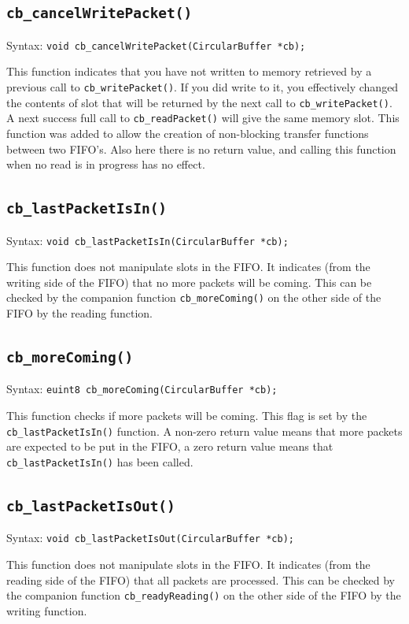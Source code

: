 \documentclass[a4paper]{article}
\begin{document}
\subsection*{\texttt{cb\_cancelWritePacket()}}
Syntax: \lstinline!void cb_cancelWritePacket(CircularBuffer *cb);!

This function indicates that you have not written to memory retrieved by a previous call to \texttt{cb\_writePacket()}.
If you did write to it, you effectively changed the contents of slot that will be returned by the next call to \texttt{cb\_writePacket()}.
A next success full call to \texttt{cb\_readPacket()} will give the same memory slot.
This function was added to allow the creation of non-blocking transfer functions between two FIFO's.
Also here there is no return value, and calling this function when no read is in progress has no effect.

\subsection*{\texttt{cb\_lastPacketIsIn()}}
Syntax: \lstinline!void cb_lastPacketIsIn(CircularBuffer *cb);!

This function does not manipulate slots in the FIFO. It indicates (from the writing side of the FIFO) that no more
packets will be coming. This can be checked by the companion function \texttt{cb\_moreComing()} on the other side of the FIFO by the
reading function.

\subsection*{\texttt{cb\_moreComing()}}
Syntax: \lstinline!euint8 cb_moreComing(CircularBuffer *cb);!

This function checks if more packets will be coming. This flag is set by the \texttt{cb\_lastPacketIsIn()} function.
A non-zero return value means that more packets are expected to be put in the FIFO, a zero return value means that
 \texttt{cb\_lastPacketIsIn()} has been called.

\subsection*{\texttt{cb\_lastPacketIsOut()}}
Syntax: \lstinline!void cb_lastPacketIsOut(CircularBuffer *cb);!

This function does not manipulate slots in the FIFO. It indicates (from the reading side of the FIFO) that all packets are processed. 
This can be checked by the companion function \texttt{cb\_readyReading()} on the other side of the FIFO by the
writing function.
\end{document}
